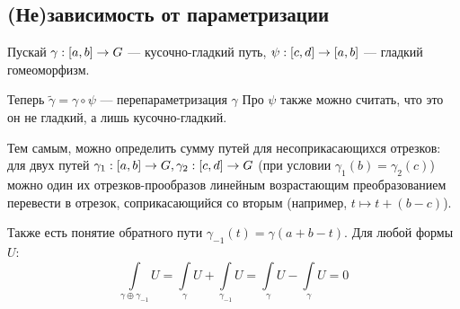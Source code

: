 \documentclass[a4paper]{report}
\begin{document}
    \subsection{(Не)зависимость от параметризации}
    Пускай $\gamma: [a, b] \rightarrow G$ --- кусочно-гладкий путь, $\psi: [c, d] \rightarrow [a, b]$ --- гладкий гомеоморфизм.

    Теперь $\tilde{\gamma} = \gamma \circ \psi$ --- перепараметризация $\gamma$
    Про $\psi$ также можно считать, что это он не гладкий, а лишь кусочно-гладкий.

    Тем самым, можно определить сумму путей для несоприкасающихся отрезков: для двух путей $\gamma_1: [a, b] \rightarrow G, \gamma_2: [c, d] \rightarrow G$ (при условии $\gamma_{1}(b) = \gamma_2(c)$) можно один их отрезков-прообразов линейным возрастающим преобразованием перевести в отрезок, соприкасающийся со вторым (например, $t \mapsto t + (b - c)$).

    Также есть понятие обратного пути $\gamma_{-1}(t) = \gamma(a + b - t)$.
    Для любой формы $U$: \[\int\limits_{\gamma \oplus \gamma_{-1}}U = \int\limits_{\gamma}U + \int\limits_{\gamma_{-1}}U = \int\limits_{\gamma}U - \int\limits_{\gamma}U = 0\]
\end{document}
